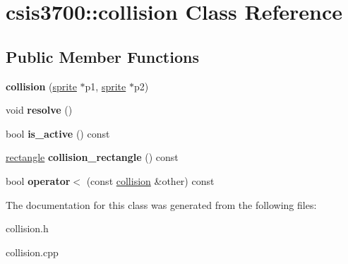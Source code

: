 \hypertarget{classcsis3700_1_1collision}{}\section{csis3700\+:\+:collision Class Reference}
\label{classcsis3700_1_1collision}
\subsection*{Public Member Functions}
\begin{DoxyCompactItemize}
\item 
\mbox{\label{classcsis3700_1_1collision_a28ce4cf4d73a43840adaf882a7f680da}} 
{\bfseries collision} (\hyperlink{classcsis3700_1_1sprite}{sprite} $\ast$p1, \hyperlink{classcsis3700_1_1sprite}{sprite} $\ast$p2)
\item 
\mbox{\label{classcsis3700_1_1collision_a5a0054399a8f03e0ad9b10c70ced45c0}} 
void {\bfseries resolve} ()
\item 
\mbox{\label{classcsis3700_1_1collision_a317f770f60f10889e7e3d9c54544dd56}} 
bool {\bfseries is\+\_\+active} () const
\item 
\mbox{\label{classcsis3700_1_1collision_a52ebb041711cf7b802715bf12270e8ab}} 
\hyperlink{classcsis3700_1_1rectangle}{rectangle} {\bfseries collision\+\_\+rectangle} () const
\item 
\mbox{\label{classcsis3700_1_1collision_a718673acc32ae44dda81f4a931037be3}} 
bool {\bfseries operator$<$} (const \hyperlink{classcsis3700_1_1collision}{collision} \&other) const
\end{DoxyCompactItemize}


The documentation for this class was generated from the following files\+:\begin{DoxyCompactItemize}
\item 
collision.\+h\item 
collision.\+cpp\end{DoxyCompactItemize}
